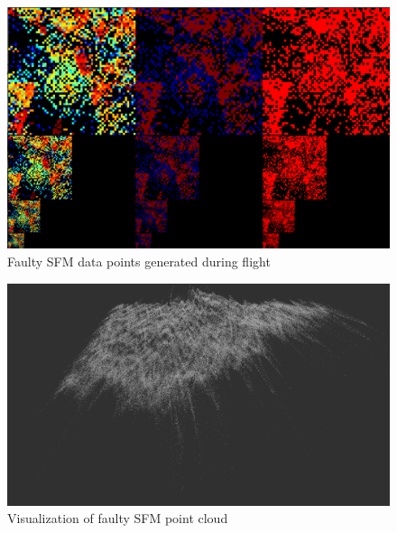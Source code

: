 \begin{figure}[h]
    \centering
    \includegraphics[scale=0.24]{images/evaluation/SFM_issues/sfm_fail.png}
    \caption{Faulty SFM data points generated during flight}
    \label{fig:sfm_fault}
\end{figure}

\begin{figure}[h]
    \centering
    \includegraphics[scale=0.20]{images/evaluation/SFM_issues/sfm_pc_fail1.png}
    \caption{Visualization of faulty SFM point cloud}
    \label{fig:sfm_pc_fault1}
\end{figure}

